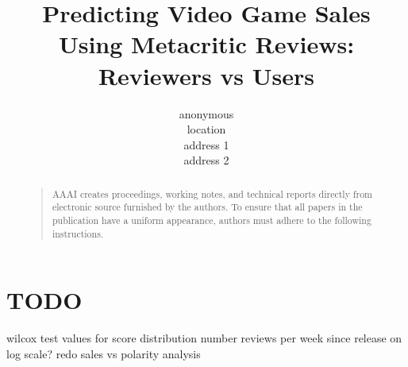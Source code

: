 \documentclass[letterpaper]{article}
\begin{document}
%
\title{Predicting Video Game Sales Using Metacritic Reviews:\\Reviewers vs Users}
\author{anonymous\\
location\\
address 1\\
address 2\\
}
\maketitle

\begin{abstract}
\begin{quote}
AAAI creates proceedings, working notes, and technical reports directly from electronic source furnished by the authors. To ensure that all papers in the publication have a uniform appearance, authors must adhere to the following instructions. 
\end{quote}
\end{abstract}

\section{TODO}
wilcox test values for score distribution
number reviews per week since release on log scale?
redo sales vs polarity analysis
\end{document}
